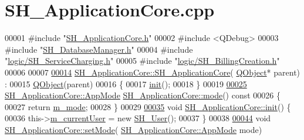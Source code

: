 \hypertarget{SH__ApplicationCore_8cpp_source}{\section{S\-H\-\_\-\-Application\-Core.\-cpp}
}

\begin{DoxyCode}
00001 \textcolor{preprocessor}{#include "\hyperlink{SH__ApplicationCore_8h}{SH\_ApplicationCore.h}"}
00002 \textcolor{preprocessor}{#include <QDebug>}
00003 \textcolor{preprocessor}{#include "\hyperlink{SH__DatabaseManager_8h}{SH\_DatabaseManager.h}"}
00004 \textcolor{preprocessor}{#include "\hyperlink{SH__ServiceCharging_8h}{logic/SH\_ServiceCharging.h}"}
00005 \textcolor{preprocessor}{#include "\hyperlink{SH__BillingCreation_8h}{logic/SH\_BillingCreation.h}"}
00006 
00007 
\hypertarget{SH__ApplicationCore_8cpp_source_l00014}{}\hyperlink{classSH__ApplicationCore_a3c33fe8a39bd571c4c809d8c55603156}{00014} \hyperlink{classSH__ApplicationCore_a3c33fe8a39bd571c4c809d8c55603156}{SH\_ApplicationCore::SH\_ApplicationCore}(
      \hyperlink{classQObject}{QObject}* parent) :
00015     \hyperlink{classQObject}{QObject}(parent)
00016 \{
00017     \hyperlink{classSH__ApplicationCore_ab50397fef5fa4a514e0a1a0443b886ce}{init}();
00018 \}
00019 
\hypertarget{SH__ApplicationCore_8cpp_source_l00025}{}\hyperlink{classSH__ApplicationCore_a210295d4d7a6e16e9def6e0a29816b51}{00025} \hyperlink{classSH__ApplicationCore_a6b93b2f83a290305f282616eb2935899}{SH\_ApplicationCore::AppMode} \hyperlink{classSH__ApplicationCore_a210295d4d7a6e16e9def6e0a29816b51}{SH\_ApplicationCore::mode}()\textcolor{keyword}{
       const}
00026 \textcolor{keyword}{}\{
00027     \textcolor{keywordflow}{return} \hyperlink{classSH__ApplicationCore_ac9587a451ab2294abe7a9eb738d93cb0}{m\_mode};
00028 \}
00029 
\hypertarget{SH__ApplicationCore_8cpp_source_l00035}{}\hyperlink{classSH__ApplicationCore_ab50397fef5fa4a514e0a1a0443b886ce}{00035} \textcolor{keywordtype}{void} \hyperlink{classSH__ApplicationCore_ab50397fef5fa4a514e0a1a0443b886ce}{SH\_ApplicationCore::init}() \{
00036     this->\hyperlink{classSH__ApplicationCore_aa61720acee7e06e9828c570e8190304a}{m\_currentUser} = \textcolor{keyword}{new} \hyperlink{classSH__User}{SH\_User}();
00037 \}
00038 
\hypertarget{SH__ApplicationCore_8cpp_source_l00044}{}\hyperlink{classSH__ApplicationCore_aeb87d289ccc9c8209928f23cf8a02ead}{00044} \textcolor{keywordtype}{void} \hyperlink{classSH__ApplicationCore_aeb87d289ccc9c8209928f23cf8a02ead}{SH\_ApplicationCore::setMode}(
      \hyperlink{classSH__ApplicationCore_a6b93b2f83a290305f282616eb2935899}{SH\_ApplicationCore::AppMode} mode)

\end{DoxyCode}
